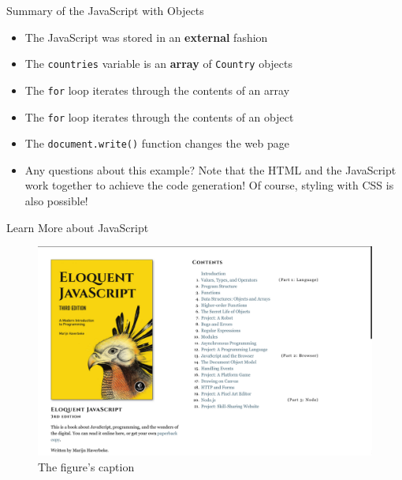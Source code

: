 \documentclass[14pt,aspectratio=169]{beamer}
\begin{document}
%
\begin{frame}{Summary of the JavaScript with Objects}
  \begin{itemize}
    \item The JavaScript was stored in an {\bf external} fashion
      \vspace*{-.15in}
    \item The {\tt countries} variable is an {\bf array} of {\tt Country}
      objects
      \vspace*{-.15in}
    \item The {\tt for} loop iterates through the contents of an array
      \vspace*{-.15in}
    \item The {\tt for} loop iterates through the contents of an object
      \vspace*{-.15in}
    \item The {\tt document.write()} function changes the web page
      \vspace*{-.15in}
    \item Any questions about this example? Note that the HTML and the
      JavaScript work together to achieve the code generation! Of course,
      styling with CSS is also possible!
      \vspace*{-.15in}
  \end{itemize}
\end{frame}

%
\begin{frame}{Learn More about JavaScript}
  \begin{figure}
    \centering
    \includegraphics[scale=.08]{images/eloquent-javascript.png}
    \caption{The figure's caption}
  \end{figure}
\end{frame}
\end{document}
